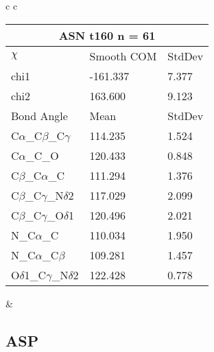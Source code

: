 \begin{longtable}{ c c }
  \\
  \begin{tabular}{ l l l }
  \toprule
  \multicolumn{3}{c}{ASN \textbf{t160} n = 61} \\ \toprule
  $\chi$       & Smooth COM & StdDev \\ \midrule
  chi1 & -161.337 & 7.377 \\ 
  chi2 & 163.600 & 9.123 \\ \midrule
  Bond Angle   & Mean     & StdDev \\ \midrule
  C$\alpha$\_C$\beta$\_C$\gamma$ & 114.235 & 1.524\\
  C$\alpha$\_C\_O & 120.433 & 0.848\\
  C$\beta$\_C$\alpha$\_C & 111.294 & 1.376\\
  C$\beta$\_C$\gamma$\_N$\delta$2 & 117.029 & 2.099\\
  C$\beta$\_C$\gamma$\_O$\delta$1 & 120.496 & 2.021\\
  N\_C$\alpha$\_C & 110.034 & 1.950\\
  N\_C$\alpha$\_C$\beta$ & 109.281 & 1.457\\
  O$\delta$1\_C$\gamma$\_N$\delta$2 & 122.428 & 0.778\\
  \bottomrule
  \end{tabular}
  &
  \\
  
\end{longtable}    

\newpage
\subsection{ASP}

